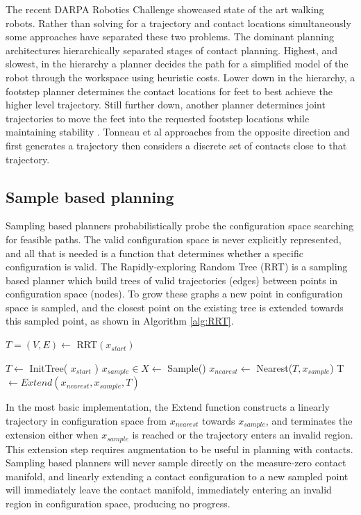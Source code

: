 \documentclass[../thesis.tex]{subfiles}
\begin{document}
The recent DARPA Robotics Challenge showcased state of the art walking robots.
Rather than solving for a trajectory and contact locations simultaneously some approaches have separated these two problems.
The dominant planning architectures hierarchically separated stages of contact planning.
Highest, and slowest, in the hierarchy a planner decides the path for a simplified model of the robot through the workspace using heuristic costs.
Lower down in the hierarchy, a footstep planner determines the contact locations for feet to best achieve the higher level trajectory.
Still further down, another planner determines joint trajectories to move the feet into the requested footstep locations while maintaining stability  \cite{Deits2015} \cite{Atkeson2015}.
Tonneau et al \cite{Tonneau} approaches from the opposite direction and first generates a trajectory then considers a discrete set of contacts close to that trajectory.



\subsection{Sample based planning} \label{sec:related:RRT}
Sampling based planners probabilistically probe the configuration space searching for feasible paths.
The valid configuration space is never explicitly represented, and all that is needed is a function that determines whether a specific configuration is valid.
The Rapidly-exploring Random Tree (RRT) is a sampling based planner which build trees of valid trajectories (edges) between points in configuration space (nodes).
To grow these graphs a new point in configuration space is sampled, and the closest point on the existing tree is extended towards this sampled point, as shown in Algorithm \ref{alg:RRT}. 
\cite{LaValle1998}

\begin{algorithm}
  \caption{$T=(V,E) \leftarrow$ RRT$(x_{start})$} \label{alg:RRT}
  \begin{algorithmic}[1]
    \State $T \leftarrow$ InitTree( $x_{start}$ )
    \State $x_{sample} \in X \leftarrow$ Sample()
    \State $x_{nearest} \leftarrow $ Nearest($T, x_{sample}$)
    \State T $\leftarrow Extend(x_{nearest}, x_{sample}, T)$
    \EndWhile
  \end{algorithmic}
\end{algorithm}

In the most basic implementation, the Extend function constructs a linearly trajectory in configuration space from $x_{nearest}$ towards $x_{sample}$, and terminates the extension either when $x_{sample}$ is reached or the trajectory enters an invalid region. \cite{LaValle1998}
This extension step requires augmentation to be useful in planning with contacts.
Sampling based planners will never sample directly on the measure-zero contact manifold, and linearly extending a contact configuration to a new sampled point will immediately leave the contact manifold, immediately entering an invalid region in configuration space, producing no progress.
\end{document}
